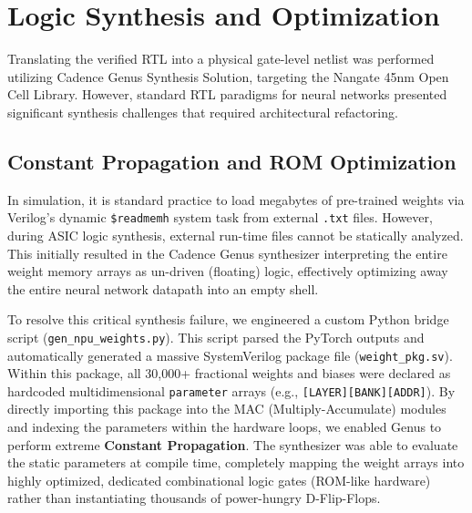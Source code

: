 \section{Logic Synthesis and Optimization}
\label{sec:synthesis}

Translating the verified RTL into a physical gate-level netlist was performed utilizing Cadence Genus Synthesis Solution, targeting the Nangate 45nm Open Cell Library. However, standard RTL paradigms for neural networks presented significant synthesis challenges that required architectural refactoring.

\subsection{Constant Propagation and ROM Optimization}
In simulation, it is standard practice to load megabytes of pre-trained weights via Verilog's dynamic \texttt{\$readmemh} system task from external \texttt{.txt} files. However, during ASIC logic synthesis, external run-time files cannot be statically analyzed. This initially resulted in the Cadence Genus synthesizer interpreting the entire weight memory arrays as un-driven (floating) logic, effectively optimizing away the entire neural network datapath into an empty shell.

To resolve this critical synthesis failure, we engineered a custom Python bridge script (\texttt{gen\_npu\_weights.py}). This script parsed the PyTorch outputs and automatically generated a massive SystemVerilog package file (\texttt{weight\_pkg.sv}). Within this package, all 30,000+ fractional weights and biases were declared as hardcoded multidimensional \texttt{parameter} arrays (e.g., \texttt{[LAYER][BANK][ADDR]}). 
By directly importing this package into the MAC (Multiply-Accumulate) modules and indexing the parameters within the hardware loops, we enabled Genus to perform extreme \textbf{Constant Propagation}. The synthesizer was able to evaluate the static parameters at compile time, completely mapping the weight arrays into highly optimized, dedicated combinational logic gates (ROM-like hardware) rather than instantiating thousands of power-hungry D-Flip-Flops.

